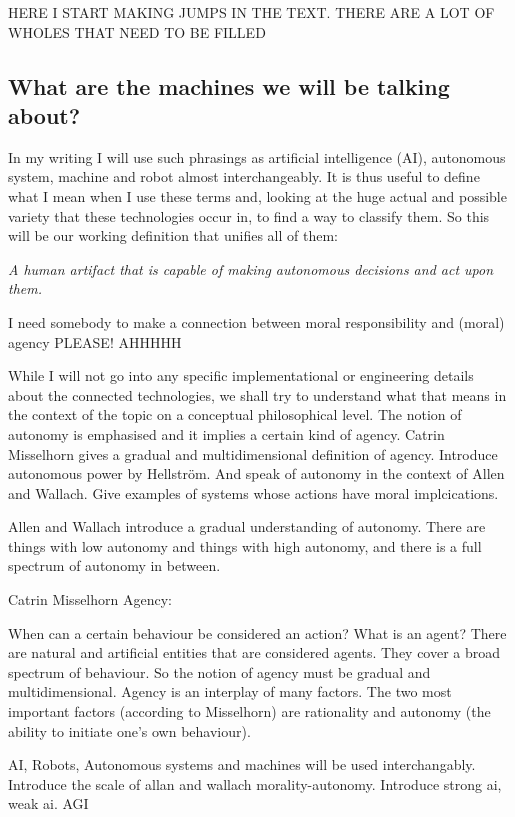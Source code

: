 \documentclass{article}
\newcounter{example}[section]
\begin{document}
 HERE I START MAKING JUMPS IN THE TEXT. THERE ARE A LOT OF WHOLES THAT NEED TO
 BE FILLED
\subsection{What are the machines we will be talking about?}

In my writing I will use such phrasings as artificial intelligence (AI),
autonomous system, machine and robot almost interchangeably. It is thus useful
to define what I mean when I use these terms and, looking at the huge actual and
possible variety that these technologies occur in, to find a way to classify
them. So this will be our working definition that unifies all of them:

\begin{center}
	\textit{A human artifact that is capable of making autonomous decisions
	and act upon them.}

\end{center}

I need somebody to make a connection between moral responsibility and (moral)
agency PLEASE! AHHHHH

While I will not go into any specific implementational or engineering details
about the connected technologies, we shall try to understand what that means in
the context of the topic on a conceptual philosophical level. The notion of
autonomy is emphasised and it implies a certain kind of agency. Catrin
Misselhorn gives a gradual and multidimensional definition of agency. Introduce
autonomous power by Hellström. And speak of autonomy in the context of Allen and
Wallach. Give examples of systems whose actions have moral implcications.


Allen and Wallach introduce a gradual understanding of autonomy. There are
things with low autonomy and things with high autonomy, and there is a full
spectrum of autonomy in between.


Catrin Misselhorn Agency:

When can a certain behaviour be considered an action? What is an agent? There
are natural and artificial entities that are considered agents. They cover a
broad spectrum of behaviour. So the notion of agency must be gradual and
multidimensional. Agency is an interplay of many factors. The two most important
factors (according to Misselhorn) are rationality and autonomy (the ability to
initiate one's own behaviour).


AI, Robots, Autonomous systems and machines will be used interchangably.
Introduce the scale of allan and wallach morality-autonomy. Introduce strong ai,
weak ai. AGI
\end{document}
